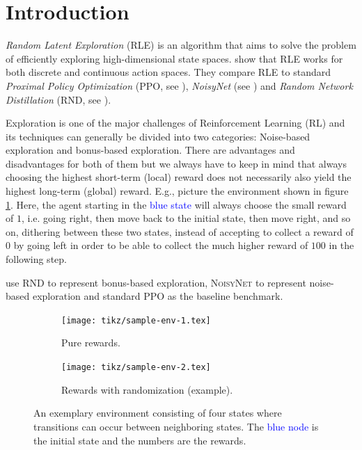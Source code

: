 \documentclass[10pt]{article} %
\begin{document}
\section{Introduction}
\textit{Random Latent Exploration} (\textsc{RLE}) is an algorithm that aims to solve the problem of efficiently exploring high-dimensional state spaces. \cite{rle-paper} show that RLE works for both discrete and continuous action spaces. They compare \textsc{RLE} to standard \textit{Proximal Policy Optimization} (\textsc{PPO}, see \cite{ppo-paper}), \textit{NoisyNet} (see \cite{noisynet-paper}) and \textit{Random Network Distillation} (\textsc{RND}, see \cite{rnd-paper}).

\noindent Exploration is one of the major challenges of Reinforcement Learning (RL) and its techniques can generally be divided into two categories: Noise-based exploration and bonus-based exploration. There are advantages and disadvantages for both of them but we always have to keep in mind that always choosing the highest short-term (local) reward does not necessarily also yield the highest long-term (global) reward. E.g., picture the environment shown in figure \ref{fig:sample-env-1}. Here, the agent starting in the \textcolor{blue}{blue state} will always choose the small reward of $1$, i.e. going right, then move back to the initial state, then move right, and so on, dithering between these two states, instead of accepting to collect a reward of $0$ by going left in order to be able to collect the much higher reward of $100$ in the following step.

\noindent \cite{rle-paper} use \textsc{RND} to represent bonus-based exploration, \textsc{NoisyNet} to represent noise-based exploration and standard \textsc{PPO} as the baseline benchmark.

\begin{figure}[h!]
  \centering
  \begin{subfigure}[b]{0.45\textwidth}
    \centering
    \texttt{[image: tikz/sample-env-1.tex]}
    \caption{Pure rewards.}
    \label{fig:sample-env-1}
  \end{subfigure}
  \hfill
  \begin{subfigure}[b]{0.45\textwidth}
    \centering
    \texttt{[image: tikz/sample-env-2.tex]}
    \caption{Rewards with randomization (example).}
    \label{fig:sample-env-2}
  \end{subfigure}
  
  \caption{An exemplary environment consisting of four states where transitions can occur between neighboring states. The \textcolor{blue}{blue node} is the initial state and the numbers are the rewards.}
  \label{fig:sample-env}
\end{figure}
\end{document}
